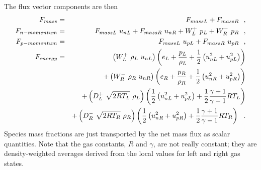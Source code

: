 The flux vector components are then
\begin{eqnarray}
 F_{mass} & = & F_{massL} + F_{massR} ~~, \nonumber \\
 F_{n-momentum} & = & F_{massL} ~ u_{nL} + F_{massR} ~ u_{nR} + W_L^+ ~ p_L + W_R^- ~ p_R ~~, \nonumber \\
 F_{p-momentum} & = & F_{massL} ~ u_{pL} + F_{massR} ~ u_{pR} ~~, \nonumber \\
 F_{energy} & = & \left( W_L^+ ~ \rho_L ~ u_{nL} \right) \left( e_L + \frac{p_L}{\rho_L} + \frac{1}{2}\left(u_{nL}^2 + u_{pL}^2\right) \right) \nonumber \\
            &   & + \left( W_R^- ~ \rho_R ~ u_{nR} \right) \left( e_R + \frac{p_R}{\rho_R} + \frac{1}{2}\left(u_{nR}^2 + u_{pR}^2\right) \right) \nonumber \\
            &   & + \left( D_L^+ ~ \sqrt{2 R T_L} ~ \rho_L \right) \left( \frac{1}{2}\left(u_{nL}^2 + u_{pL}^2\right) + \frac{1}{2} \frac{\gamma + 1}{\gamma - 1} R T_L \right) \nonumber \\
            &   & + \left( D_R^- ~ \sqrt{2 R T_R} ~ \rho_R \right) \left( \frac{1}{2}\left(u_{nR}^2 + u_{pR}^2\right) + \frac{1}{2} \frac{\gamma + 1}{\gamma - 1} R T_R \right)~~.
\end{eqnarray}
Species mass fractions are just transported by the net mass flux as scalar quantities.
Note that the gas constants, $R$ and $\gamma$, are not really constant; 
they are density-weighted averages derived from the local values for left and right gas states.
 
